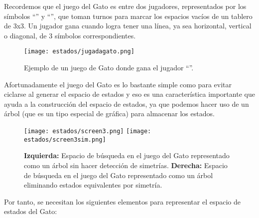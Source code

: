Recordemos que el juego del Gato es entre dos jugadores, representados por los símbolos \enquote{} y \enquote{}, que toman turnos para marcar los espacios vacíos de un tablero de 3x3.
Un jugador gana cuando logra tener una línea, ya sea horizontal, vertical o diagonal, de 3 símbolos correspondientes. 

\begin{figure}
  \centering
  \texttt{[image: estados/jugadagato.png]}
  \caption{Ejemplo de un juego de Gato donde gana el jugador \enquote{}.}
  \label{fig:tictactoe}
\end{figure}

Afortunadamente el juego del Gato es lo bastante simple como para evitar ciclarse al generar el espacio de estados y eso es una característica importante que ayuda a la construcción del espacio de estados, ya que  podemos hacer uso de un árbol (que es un tipo especial de gráfica) para almacenar los estados.\par


\begin{figure}
  \centering
  \texttt{[image: estados/screen3.png]}
  \texttt{[image: estados/screen3sim.png]}
  \caption{\textbf{Izquierda:} Espacio de búsqueda en el juego del Gato representado como un árbol sin hacer detección de simetrías. \textbf{Derecha:} Espacio de búsqueda en el juego del Gato representado como un árbol eliminando estados equivalentes por simetría.}
  \label{fig:espaciogato}
\end{figure}

Por tanto, se necesitan los siguientes elementos para representar el espacio de estados del Gato:

